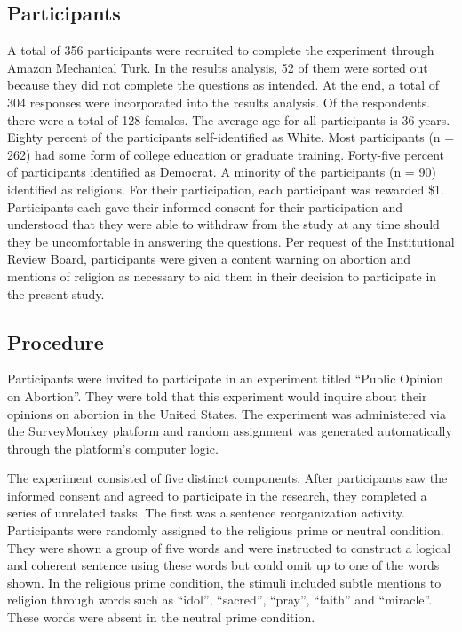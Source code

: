 \documentclass[letterpaper,man,natbib,noextraspace,12pt]{apa6}  %
\begin{document}
\subsection{Participants}

A total of 356 participants were recruited to complete the experiment through Amazon Mechanical Turk. In the results analysis, 52 of them were sorted out because they did not complete the questions as intended. At the end, a total of 304 responses were incorporated into the results analysis. Of the respondents. there were a total of 128 females. The average age for all participants is 36 years. Eighty percent of the participants self-identified as White. Most participants (n = 262) had some form of college education or graduate training. Forty-five percent of participants identified as Democrat. A minority of the participants (n = 90) identified as religious. For their participation, each participant was rewarded \$1. Participants each gave their informed consent for their participation and understood that they were able to withdraw from the study at any time should they be uncomfortable in answering the questions. Per request of the Institutional Review Board, participants were given a content warning on abortion and mentions of religion as necessary to aid them in their decision to participate in the present study.

\subsection{Procedure}

Participants were invited to participate in an experiment titled “Public Opinion on Abortion”. They were told that this experiment would inquire about their opinions on abortion in the United States. The experiment was administered via the SurveyMonkey platform and random assignment was generated automatically through the platform’s computer logic. 

The experiment consisted of five distinct components. After participants saw the informed consent and agreed to participate in the research, they completed a series of unrelated tasks. The first was a sentence reorganization activity. \citep{bakhti_religious_2018} Participants were randomly assigned to the religious prime or neutral condition. They were shown a group of five words and were instructed to construct a logical and coherent sentence using these words but could omit up to one of the words shown. In the religious prime condition, the stimuli included subtle mentions to religion through words such as “idol”, “sacred”, “pray”, “faith” and “miracle”. These words were absent in the neutral prime condition. 
\end{document}
